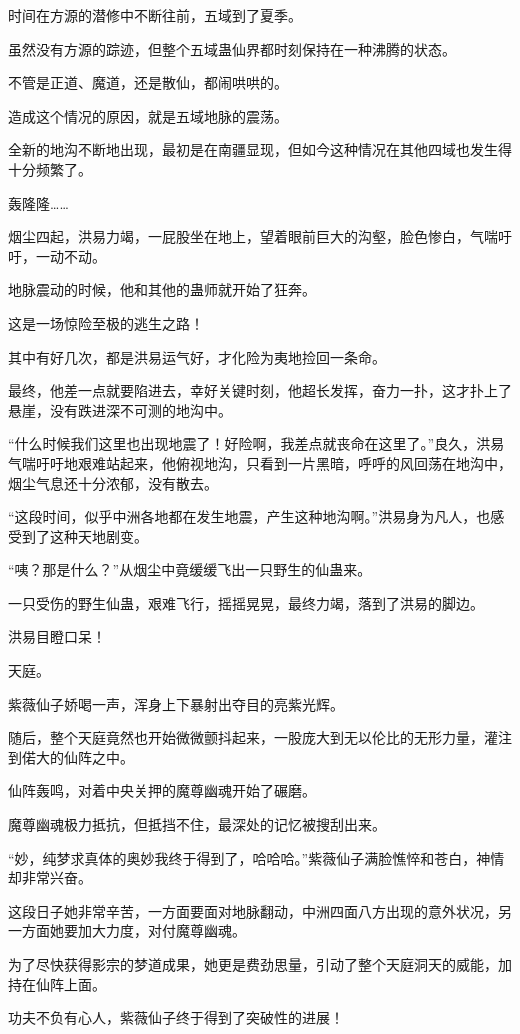 \begin{this_body}
时间在方源的潜修中不断往前，五域到了夏季。

虽然没有方源的踪迹，但整个五域蛊仙界都时刻保持在一种沸腾的状态。

不管是正道、魔道，还是散仙，都闹哄哄的。

造成这个情况的原因，就是五域地脉的震荡。

全新的地沟不断地出现，最初是在南疆显现，但如今这种情况在其他四域也发生得十分频繁了。

轰隆隆……

烟尘四起，洪易力竭，一屁股坐在地上，望着眼前巨大的沟壑，脸色惨白，气喘吁吁，一动不动。

地脉震动的时候，他和其他的蛊师就开始了狂奔。

这是一场惊险至极的逃生之路！

其中有好几次，都是洪易运气好，才化险为夷地捡回一条命。

最终，他差一点就要陷进去，幸好关键时刻，他超长发挥，奋力一扑，这才扑上了悬崖，没有跌进深不可测的地沟中。

“什么时候我们这里也出现地震了！好险啊，我差点就丧命在这里了。”良久，洪易气喘吁吁地艰难站起来，他俯视地沟，只看到一片黑暗，呼呼的风回荡在地沟中，烟尘气息还十分浓郁，没有散去。

“这段时间，似乎中洲各地都在发生地震，产生这种地沟啊。”洪易身为凡人，也感受到了这种天地剧变。

“咦？那是什么？”从烟尘中竟缓缓飞出一只野生的仙蛊来。

一只受伤的野生仙蛊，艰难飞行，摇摇晃晃，最终力竭，落到了洪易的脚边。

洪易目瞪口呆！

天庭。

紫薇仙子娇喝一声，浑身上下暴射出夺目的亮紫光辉。

随后，整个天庭竟然也开始微微颤抖起来，一股庞大到无以伦比的无形力量，灌注到偌大的仙阵之中。

仙阵轰鸣，对着中央关押的魔尊幽魂开始了碾磨。

魔尊幽魂极力抵抗，但抵挡不住，最深处的记忆被搜刮出来。

“妙，纯梦求真体的奥妙我终于得到了，哈哈哈。”紫薇仙子满脸憔悴和苍白，神情却非常兴奋。

这段日子她非常辛苦，一方面要面对地脉翻动，中洲四面八方出现的意外状况，另一方面她要加大力度，对付魔尊幽魂。

为了尽快获得影宗的梦道成果，她更是费劲思量，引动了整个天庭洞天的威能，加持在仙阵上面。

功夫不负有心人，紫薇仙子终于得到了突破性的进展！


\end{this_body}
